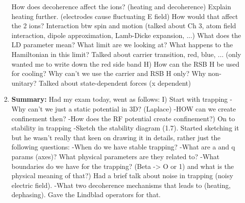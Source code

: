 \documentclass{article}%
\begin{document}
\begin{enumerate}
 How does decoherence affect the ions? (heating and decoherence)\newline%
 Explain heating further. (electrodes cause fluctuating E field)\newline%
 How would that affect the 2 ions?\newline%
 Interaction btw spin and motion (talked about Ch 3, atom field interaction, dipole approximation, Lamb{-}Dicke expansion, ...)\newline%
 What does the LD parameter mean?\newline%
 What limit are we looking at?\newline%
 What happens to the Hamiltonian in this limit? Talked about carrier transition, red, blue, ... (only wanted me to write down the red side band H)\newline%
 How can the RSB H be used for cooling?\newline%
 Why can't we use the carrier and RSB H only?\newline%
 Why non{-}unitary?\newline%
 Talked about state{-}dependent forces (x dependent)%
\item%
\begin{mycolorbox}%
\textbf{Summary:}%
\newline%
Had my exam today, went as follows:\newline%
 I) Start with trapping\newline%
 {-}Why can't we just a static potential in 3D? (Laplace)\newline%
 {-}HOW can we create confinement then?\newline%
 {-}How does the RF potential create confinement?) On to stability in trapping\newline%
 {-}Sketch the stability diagram (1.7). Started sketching it but he wasn't really that keen on drawing it in details, rather just the following questions:\newline%
 {-}When do we have stable trapping?\newline%
 {-}What are a and q params (axes)? What physical parameters are they related to?\newline%
 {-}What boundaries do we have for the trapping? (Beta {-}> O or 1) and what is the physical meaning of that?) Had a brief talk about noise in trapping (noisy electric field).\newline%
 {-}What two decoherence mechanisms that leads to (heating, dephasing). Gave the Lindblad operators for that.\newline%

\end{mycolorbox}
\end{enumerate}
\end{document}
